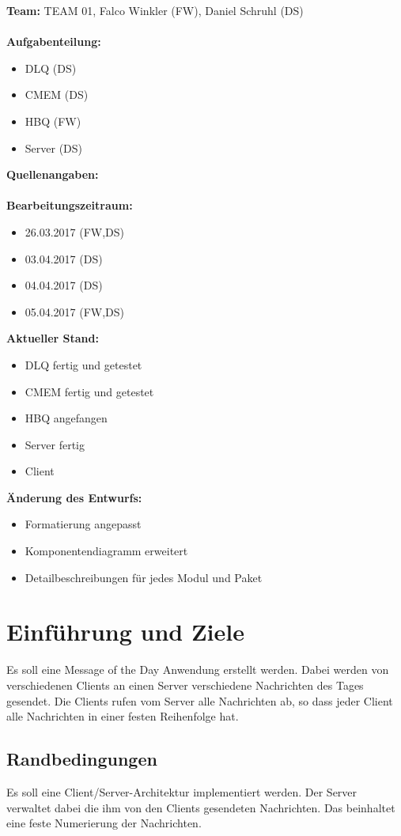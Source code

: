 \documentclass{article}
\begin{document}
\textbf{Team:} TEAM 01, Falco Winkler (FW), Daniel Schruhl (DS)\\
\\
\textbf{Aufgabenteilung:}
\begin{itemize}
    \item DLQ (DS)
    \item CMEM (DS)
	\item HBQ (FW)
	\item Server (DS)
\end{itemize}

\textbf{Quellenangaben:}\\
\\
\textbf{Bearbeitungszeitraum:}
\begin{itemize}
	\item 26.03.2017 (FW,DS)
	\item 03.04.2017 (DS)
	\item 04.04.2017 (DS)
	\item 05.04.2017 (FW,DS)
\end{itemize}

\textbf{Aktueller Stand:}
\begin{itemize}
	\item DLQ fertig und getestet
	\item CMEM fertig und getestet
	\item HBQ angefangen
	\item Server fertig
	\item Client
\end{itemize}

\textbf{Änderung des Entwurfs:}
\begin{itemize}
    \item Formatierung angepasst
	\item Komponentendiagramm erweitert
	\item Detailbeschreibungen für jedes Modul und Paket
\end{itemize}

\newpage

\section{Einführung und Ziele}
Es soll eine Message of the Day Anwendung erstellt werden. Dabei werden von verschiedenen Clients an einen Server verschiedene Nachrichten des Tages gesendet. Die Clients rufen vom Server alle Nachrichten ab, so dass jeder Client alle Nachrichten in einer festen Reihenfolge hat.

\subsection{Randbedingungen}
Es soll eine Client/Server-Architektur implementiert werden.
Der Server verwaltet dabei die ihm von den Clients gesendeten Nachrichten. Das beinhaltet eine feste Numerierung der Nachrichten.
\end{document}
